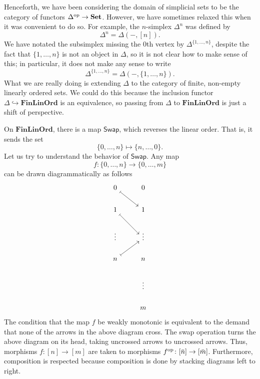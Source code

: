 \documentclass[main.tex]{subfiles}
\begin{document}
Henceforth, we have been considering the domain of simplicial sets to be the category of functors $\Delta^{\mathrm{op}} \to \mathbf{Set}$. However, we have sometimes relaxed this when it was convenient to do so. For example, the $n$-simplex $\Delta^{n}$ was defined by
\begin{equation*}
  \Delta^{n} = \Delta(-, [n]).
\end{equation*}
We have notated the subsimplex missing the 0th vertex by $\Delta^{\{1, \ldots, n\}}$, despite the fact that $\{1, \ldots, n\}$ is not an object in $\Delta$, so it is not clear how to make sense of this; in particular, it does not make any sense to write
\begin{equation*}
  \Delta^{\{1, \ldots, n\}} = \Delta(-, \{1, \ldots, n\}).
\end{equation*}
What we are really doing is extending $\Delta$ to the category of finite, non-empty linearly ordered sets. We could do this because the inclusion functor $\Delta \hookrightarrow \mathbf{FinLinOrd}$ is an equivalence, so passing from $\Delta$ to $\mathbf{FinLinOrd}$ is just a shift of perspective.

On $\mathbf{FinLinOrd}$, there is a map $\mathsf{Swap}$, which reverses the linear order. That is, it sends the set
\begin{equation*}
  \{0, \ldots, n\} \mapsto \{n, \ldots, 0\}.
\end{equation*}
Let us try to understand the behavior of $\mathsf{Swap}$. Any map
\begin{equation*}
  f\colon \{0, \ldots, n\} \to \{0, \ldots, m\}
\end{equation*}
can be drawn diagrammatically as follows
\begin{equation*}
  \begin{tikzcd}
    0
    \arrow[dr, mapsto]
    & 0
    \\
    1
    \arrow[dr, mapsto]
    & 1
    \\
    \vdots
    & \vdots
    \\
    n
    \arrow[ur, mapsto]
    & n
    \\
    & \vdots
    \\
    & m
  \end{tikzcd}
\end{equation*}
The condition that the map $f$ be weakly monotonic is equivalent to the demand that none of the arrows in the above diagram cross. The swap operation turns the above diagram on its head, taking uncrossed arrows to uncrossed arrows. Thus, morphisms $f\colon [n] \to [m]$ are taken to morphisms $f^{\mathrm{op}}\colon [\bar{n}] \to [\bar{m}]$. Furthermore, composition is respected because composition is done by stacking diagrams left to right.
\end{document}
